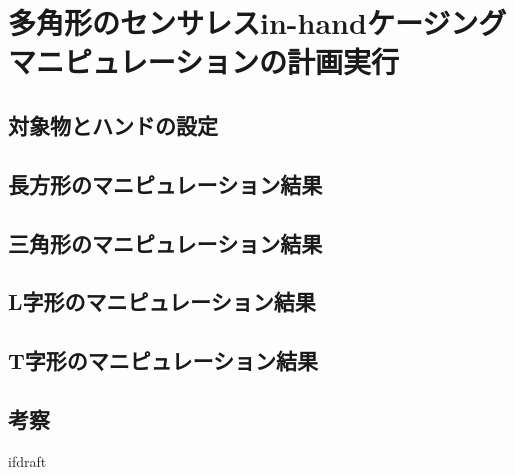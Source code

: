 \documentclass[a4paper,twoside,12pt,papersize, dvipdfmx]{iirthesis}
\begin{document}
    \newcommand{\figref}[1]{\figurename\ref{#1}}
    \newcommand{\tabref}[1]{\tablename\ref{#1}}
    \renewcommand{\eqref}[1]{式~(\ref{#1})}
    \newcommand{\chapref}[1]{\ref{#1}章}
    \newcommand{\secref}[1]{\ref{#1}節}
    \newcommand{\ssecref}[1]{\ref{#1}項}
    \newcommand{\appref}[1]{付録\ref{#1}}
\fi


\chapter{多角形のセンサレスin-handケージングマニピュレーションの計画実行}
\minitoc

\section{対象物とハンドの設定}
\section{長方形のマニピュレーション結果}
\section{三角形のマニピュレーション結果}
\section{L字形のマニピュレーション結果}
\section{T字形のマニピュレーション結果}
\section{考察}




\expandafter\ifx\csname ifdraft\endcsname\relax
    
\end{document}
